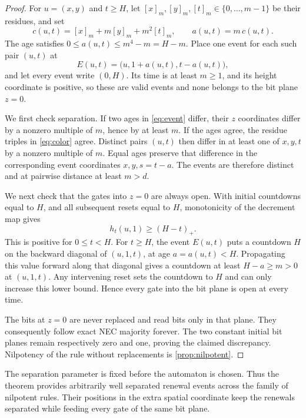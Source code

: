 \documentclass[11pt]{article}
\theoremstyle{plain}
\theoremstyle{definition}
\theoremstyle{remark}
\begin{document}
\begin{proof}
For $u=(x,y)$ and $t\geq H$, let $[x]_m,[y]_m,[t]_m\in\{0,\ldots,m-1\}$ be their residues, and set
\begin{equation}\label{eq:color}
 c(u,t)=[x]_m+m[y]_m+m^2[t]_m,
 \qquad a(u,t)=m\,c(u,t).
\end{equation}
The age satisfies $0\leq a(u,t)\leq m^4-m=H-m$. Place one event for each such pair $(u,t)$ at
\begin{equation}\label{eq:event}
 E(u,t)=\bigl(u,1+a(u,t),t-a(u,t)\bigr),
\end{equation}
and let every event write $(0,H)$. Its time is at least $m\geq1$, and its height coordinate is positive, so these are valid events and none belongs to the bit plane $z=0$.

We first check separation. If two ages in \eqref{eq:event} differ, their $z$ coordinates differ by a nonzero multiple of $m$, hence by at least $m$. If the ages agree, the residue triples in \eqref{eq:color} agree. Distinct pairs $(u,t)$ then differ in at least one of $x,y,t$ by a nonzero multiple of $m$. Equal ages preserve that difference in the corresponding event coordinates $x,y,s=t-a$. The events are therefore distinct and at pairwise distance at least $m>d$.

We next check that the gates into $z=0$ are always open. With initial countdowns equal to $H$, and all subsequent resets equal to $H$, monotonicity of the decrement map gives
\[
 h_t(u,1)\geq(H-t)_+.
\]
This is positive for $0\leq t<H$. For $t\geq H$, the event $E(u,t)$ puts a countdown $H$ on the backward diagonal of $(u,1,t)$, at age $a=a(u,t)<H$. Propagating this value forward along that diagonal gives a countdown at least $H-a\geq m>0$ at $(u,1,t)$. Any intervening reset sets the countdown to $H$ and can only increase this lower bound. Hence every gate into the bit plane is open at every time.

The bits at $z=0$ are never replaced and read bits only in that plane. They consequently follow exact NEC majority forever. The two constant initial bit planes remain respectively zero and one, proving the claimed discrepancy. Nilpotency of the rule without replacements is \cref{prop:nilpotent}.
\end{proof}

The separation parameter is fixed before the automaton is chosen. Thus the theorem provides arbitrarily well separated renewal events across the family of nilpotent rules. Their positions in the extra spatial coordinate keep the renewals separated while feeding every gate of the same bit plane.
\end{document}
